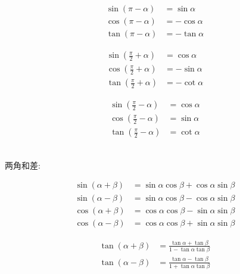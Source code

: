 \documentclass[hyperref, UTF8,11pt,a4paper]{ctexart} %
\begin{document}
\begin{figure}[!h] %
	\centering
	\begin{minipage}{170pt}
		$$
	\begin{aligned} \sin (\pi-\alpha) &=\sin \alpha \\ \cos (\pi-\alpha) &=-\cos \alpha \\ \tan (\pi-\alpha) &=-\tan \alpha \end{aligned}
	$$
	\end{minipage}
	\hspace{10pt}
	\begin{minipage}{170pt}
		$$
	\begin{aligned} \sin \left(\frac{\pi}{2}+\alpha\right) &=\cos \alpha \\ \cos \left(\frac{\pi}{2}+\alpha\right) &=-\sin \alpha \\ \tan \left(\frac{\pi}{2}+\alpha\right) &=-\cot \alpha \end{aligned}
	$$
	\end{minipage}
	\hspace{10pt}
	\begin{minipage}{170pt}
		$$
	\begin{aligned} \sin \left(\frac{\pi}{2}-\alpha\right) &=\cos \alpha \\ \cos \left(\frac{\pi}{2}-\alpha\right) &=\sin \alpha \\ \tan \left(\frac{\pi}{2}-\alpha\right) &=\cot \alpha \end{aligned}
	$$
	\end{minipage}
\end{figure}
\\
两角和差:
\begin{figure}[!h] %
	\centering
	\begin{minipage}{170pt}
		$$
	\begin{aligned} \sin (\alpha+\beta) &=\sin \alpha \cos \beta+\cos \alpha \sin \beta \\ \sin (\alpha-\beta) &=\sin \alpha \cos \beta-\cos \alpha \sin \beta \\ \cos (\alpha+\beta) &=\cos \alpha \cos \beta-\sin \alpha \sin \beta \\ \cos (\alpha-\beta) &=\cos \alpha \cos \beta+\sin \alpha \sin \beta \end{aligned}
	$$
	\end{minipage}
	\hspace{10pt}
	\begin{minipage}{170pt}
		$$
	\begin{aligned} \tan (\alpha+\beta) &=\frac{\tan \alpha+\tan \beta}{1-\tan \alpha \tan \beta} \\ \tan (\alpha-\beta) &=\frac{\tan \alpha-\tan \beta}{1+\tan \alpha \tan \beta} \end{aligned}
	$$
	\end{minipage}
	\hspace{10pt}
	\begin{minipage}{170pt}
	\end{minipage}
\end{figure}
\end{document}
